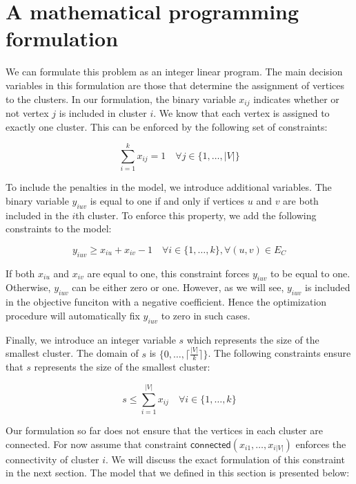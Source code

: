 \documentclass[]{article}
\begin{document}
\section{A mathematical programming formulation}
\label{sec:formulation}

We can formulate this problem as an integer linear program. The main
decision variables in this formulation are those that determine the
assignment of vertices to the clusters. In our formulation, the binary
variable $x_{ij}$ indicates whether or not vertex $j$ is included in
cluster $i$. We know that each vertex is assigned to exactly one
cluster. This can be enforced by the following set of constraints:

\begin{equation}
\sum_{i=1}^k x_{ij} = 1 \quad \forall j \in \{1, \ldots, |V|\}
\end{equation}

To include the penalties in the model, we introduce additional
variables. The binary variable $y_{iuv}$ is equal to one if and only if
vertices $u$ and $v$ are both included in the $i$th cluster. To enforce
this property, we add the following constraints to the model:

\begin{equation}
y_{iuv} \geq x_{iu} + x_{iv} -1 \quad \forall i \in \{1, \ldots, k\}, \forall (u, v) \in E_{C}
\end{equation}

If both $x_{iu}$ and $x_{iv}$ are equal to one, this constraint forces
$y_{iuv}$ to be equal to one. Otherwise, $y_{iuv}$ can be either zero or
one. However, as we will see, $y_{iuv}$ is included in the objective
funciton with a negative coefficient. Hence the optimization procedure
will automatically fix $y_{iuv}$ to zero in such cases.

Finally, we introduce an integer variable $s$ which represents the size
of the smallest cluster. The domain of $s$ is
$\{0, \ldots, \lceil \frac{|V|}{k} \rceil \}$. The following constraints
ensure that $s$ represents the size of the smallest cluster:

\begin{equation}
s \leq \sum_{i=1}^{|V|} x_{ij} \quad \forall i \in \{1, \ldots, k\}
\end{equation}

Our formulation so far does not ensure that the vertices in each cluster
are connected. For now assume that constraint
$\mathsf{connected}(x_{i1}, \ldots, x_{i|V|})$ enforces the connectivity of
cluster $i$. We will discuss the exact formulation of this constraint in
the next section. The model that we defined in this section is presented
below:
\end{document}
